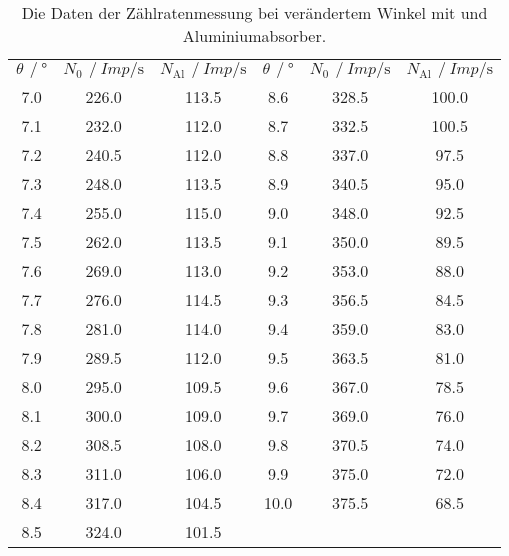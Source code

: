   \begin{table}[H]
    \centering
    \caption{Die Daten der Zählratenmessung bei verändertem Winkel mit und Aluminiumabsorber.}
    \label{tab:aluabsorber}
    \begin{tabular}{S[table-format=1.1] S[table-format=3.1] S[table-format=3.1] S[table-format=2.1] S[table-format=3.1] S[table-format=3.1]} %
      \toprule
      {$ \theta \, \mathbin{/} \si{\degree}$} & {$ N_0 \, \mathbin{/} \si{Imp\per\second}$} &  {$ N_{\text{Al}} \, \mathbin{/} \si{Imp\per\second}$} & 
      {$ \theta \, \mathbin{/} \si{\degree}$} & {$ N_0 \, \mathbin{/} \si{Imp\per\second}$} &  {$ N_{\text{Al}} \, \mathbin{/} \si{Imp\per\second}$} \\
      \cmidrule(lr){1-3} \cmidrule(lr){4-6}
      7.0 &   226.0 &   113.5 &     8.6   &   328.5 &   100.0   \\
      7.1 &   232.0 &   112.0 &     8.7   &   332.5 &   100.5   \\
      7.2 &   240.5 &   112.0 &     8.8   &   337.0 &   97.5    \\
      7.3 &   248.0 &   113.5 &     8.9   &   340.5 &   95.0    \\
      7.4 &   255.0 &   115.0 &     9.0   &   348.0 &   92.5    \\
      7.5 &   262.0 &   113.5 &     9.1   &   350.0 &   89.5    \\
      7.6 &   269.0 &   113.0 &     9.2   &   353.0 &   88.0    \\
      7.7 &   276.0 &   114.5 &     9.3   &   356.5 &   84.5    \\
      7.8 &   281.0 &   114.0 &     9.4   &   359.0 &   83.0    \\
      7.9 &   289.5 &   112.0 &     9.5   &   363.5 &   81.0    \\
      8.0 &   295.0 &   109.5 &     9.6   &   367.0 &   78.5    \\
      8.1 &   300.0 &   109.0 &     9.7   &   369.0 &   76.0    \\
      8.2 &   308.5 &   108.0 &     9.8   &   370.5 &   74.0    \\
      8.3 &   311.0 &   106.0 &     9.9   &   375.0 &   72.0    \\
      8.4 &   317.0 &   104.5 &     10.0  &   375.5 &   68.5    \\
      8.5 &   324.0 &   101.5 \\ 
      \bottomrule        
    \end{tabular}
  \end{table}


